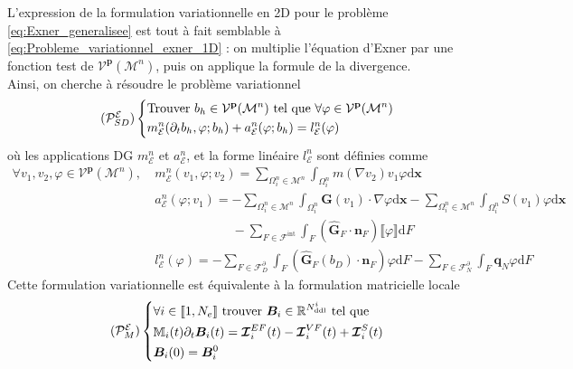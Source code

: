 \documentclass[11pt, a4paper, oneside]{report}
\begin{document}
L'expression de la formulation variationnelle en 2D pour le problème \eqref{eq:Exner_generalisee} est tout à fait semblable à \eqref{eq:Probleme_variationnel_exner_1D} : on multiplie l'équation d'Exner par une fonction test de $\mathcal{V}^{\mathbf{p}}(\mathcal{M}^n)$, puis on applique la formule de la divergence. \\
Ainsi, on cherche à résoudre le problème variationnel
\begin{equation} \tag{$\mathcal{P}_{SD}^{\mathcal{E}}$} \label{eq:Probleme_variationnel_exner}
    \left \{
    \begin{aligned}
        & \text{Trouver } b_h \in \mathcal{V}^\mathbf{p}(\mathcal{M}^n) \text{ tel que } \forall \varphi \in \mathcal{V}^\mathbf{p}(\mathcal{M}^n) \\
        & m_\mathcal{E}^n(\partial_t b_h, \varphi; b_h) + a_\mathcal{E}^n(\varphi; b_h) = l_\mathcal{E}^n (\varphi)
    \end{aligned}
    \right .
\end{equation}
où les applications DG $m_\mathcal{E}^n$ et $a_\mathcal{E}^n$, et la forme linéaire $l_\mathcal{E}^n$ sont définies comme
\begin{equation}
    \begin{aligned}
        \forall v_1, v_2, \varphi \in \mathcal{V}^\mathbf{p}(\mathcal{M}^n), ~ &m_\mathcal{E}^n(v_1, \varphi; v_2) = \sum_{\Omega_i^n \in \mathcal{M}^n} \int_{\Omega_i^n} m(\nabla v_2) v_1 \varphi \text{d}\bm{x} \\
        & a_\mathcal{E}^n(\varphi; v_1) = - \sum_{\Omega_i^n \in \mathcal{M}^n} \int_{\Omega_i^n} \bm{G}(v_1) \cdot \nabla \varphi \text{d}\bm{x} - \sum_{\Omega_i^n \in \mathcal{M}^n} \int_{\Omega_i^n} S(v_1) \varphi \text{d}\bm{x} \\
        & \phantom{a_\mathcal{E}^n(\varphi; v_1) = } - \sum_{F \in \mathcal{F}^\text{int}} \int_F \left( \bm{\widehat{G}}_F \cdot \bm{n}_F \right) \llbracket \varphi \rrbracket \text{d}F \\
        & l_\mathcal{E}^n(\varphi) = - \sum_{F \in \mathcal{F}_D^\partial} \int_F \left( \bm{\widehat{G}}_F(b_D) \cdot \bm{n}_F \right) \varphi \text{d}F - \sum_{F \in \mathcal{F}_N^\partial} \int_F \bm{q}_N \varphi \text{d}F
    \end{aligned}
\end{equation}
Cette formulation variationnelle est équivalente à la formulation matricielle locale
\begin{equation} \tag{$\mathcal{P}_M^\mathcal{E}$} \label{eq:Probleme_matriciel_exner}
    \left \{
    \begin{aligned}
        & \forall i \in \llbracket 1, N_e \rrbracket \text{ trouver } \bm{B}_i \in \mathbb{R}^{N_\text{ddl}^i} \text{ tel que } \\
        & \mathbb{M}_i(t) \partial_t \bm{B}_i(t) = \bm{\mathcal{I}}_i^{EF}(t) - \bm{\mathcal{I}}_i^{VF}(t) + \bm{\mathcal{I}}_i^S(t) \\
        & \bm{B}_i(0) = \bm{B}_i^0
    \end{aligned}
    \right .
\end{equation}
\end{document}
